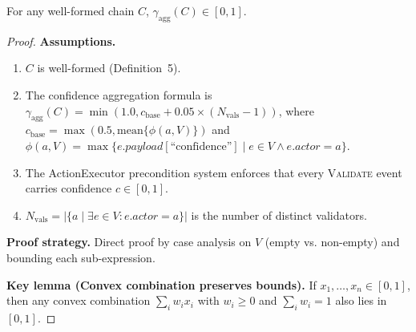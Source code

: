 \begin{theorem}[Boundedness]\label{thm:boundedness}
For any well-formed chain $C$, $\gamma_{\text{agg}}(C) \in [0, 1]$.
\end{theorem}

\begin{proof}
\textbf{Assumptions.}
\begin{enumerate}[label=(A\arabic*),leftmargin=2em]
    \item $C$ is well-formed (Definition~5).
    \item The confidence aggregation formula is $\gamma_{\text{agg}}(C) = \min(1.0, c_{\text{base}} + 0.05 \times (N_{\text{vals}} - 1))$, where $c_{\text{base}} = \max(0.5, \text{mean}\{\phi(a, V)\})$ and $\phi(a, V) = \max\{e.\textit{payload}[\text{``confidence''}] \mid e \in V \land e.\textit{actor} = a\}$.
    \item The ActionExecutor precondition system enforces that every \textsc{Validate} event carries confidence $c \in [0, 1]$.
    \item $N_{\text{vals}} = |\{a \mid \exists e \in V : e.\textit{actor} = a\}|$ is the number of distinct validators.
\end{enumerate}

\textbf{Proof strategy.} Direct proof by case analysis on $V$ (empty vs. non-empty) and bounding each sub-expression.

\textbf{Key lemma (Convex combination preserves bounds).} If $x_1, \ldots, x_n \in [0, 1]$, then any convex combination $\sum_i w_i x_i$ with $w_i \geq 0$ and $\sum_i w_i = 1$ also lies in $[0, 1]$.


\end{proof}

